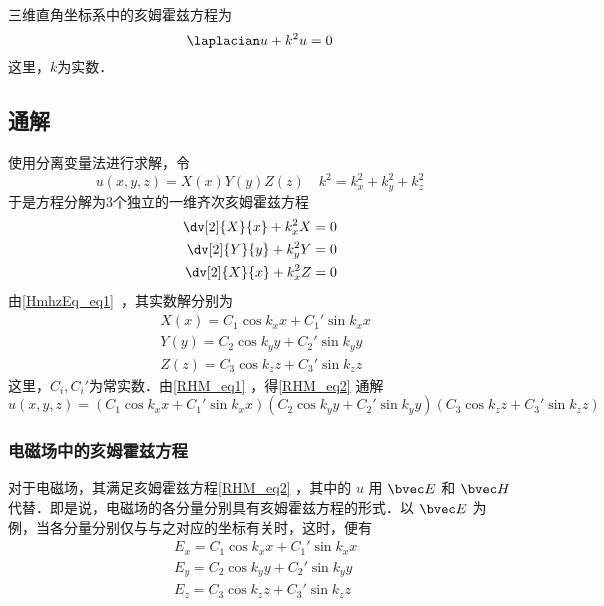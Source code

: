 三维直角坐标系中的亥姆霍兹方程为
\begin{equation}\label{RHM_eq2}
\laplacian u+k^2u=0
\end{equation}
这里，$k$为实数．
\subsection{通解}
使用分离变量法进行求解，令
\begin{equation}\label{RHM_eq1}
u(x,y,z)=X(x)Y(y)Z(z)\quad
k^2=k_x^2+k_y^2+k_z^2
\end{equation}
于是方程分解为3个独立的一维齐次亥姆霍兹方程
\begin{equation}
\begin{aligned}
\dv[2]{X}{x}+k_x^2X=0\\
\dv[2]{Y}{y}+k_y^2Y=0\\
\dv[2]{X}{x}+k_x^2Z=0
\end{aligned}
\end{equation}
由\autoref{HmhzEq_eq1}~，其实数解分别为
\begin{equation}
\begin{aligned}
&X(x)=C_1\cos k_xx+C_1'\sin k_xx\\
&Y(y)=C_2\cos k_yy+C_2'\sin k_yy\\
&Z(z)=C_3\cos k_zz+C_3'\sin k_zz
\end{aligned}
\end{equation}
这里，$C_i,C_i'$为常实数．由\autoref{RHM_eq1} ，得\autoref{RHM_eq2} 通解
\begin{equation}
u(x,y,z)=(C_1\cos k_xx+C_1'\sin k_xx)(C_2\cos k_yy+C_2'\sin k_yy)(C_3\cos k_zz+C_3'\sin k_zz)
\end{equation}
\subsubsection{电磁场中的亥姆霍兹方程}
对于电磁场，其满足亥姆霍兹方程\autoref{RHM_eq2} ，其中的 $u$ 用 $\bvec E$ 和 $\bvec H$ 代替．即是说，电磁场的各分量分别具有亥姆霍兹方程的形式．以 $\bvec E$ 为例，当各分量分别仅与与之对应的坐标有关时，这时，便有
\begin{equation}
\begin{aligned}
&E_x=C_1\cos k_xx+C_1'\sin k_xx\\
&E_y=C_2\cos k_yy+C_2'\sin k_yy\\
&E_z=C_3\cos k_zz+C_3'\sin k_zz
\end{aligned}
\end{equation}
